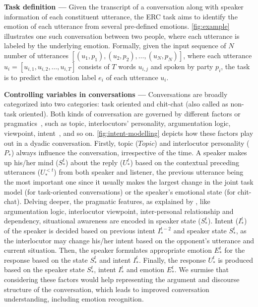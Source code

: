 \documentclass{IEEEtran}\usepackage[pdftex]{graphicx}
\begin{document}
	\textbf{Task definition --- }Given the transcript of a conversation along with speaker information
	of each constituent utterance, the ERC task aims to identify the emotion of each utterance from 
	several pre-defined emotions. \cref{fig:example} illustrates one such
	conversation between two people, where each utterance is labeled by the
	underlying emotion. Formally, given the input sequence of $N$ number of
	utterances $[(u_1, p_1), (u_2,p_2),\dots, (u_N,p_N)]$, where each utterance $u_i=[u_{i,1},u_{i,2},\dots,u_{i,T}]$ consists of $T$ words $u_{i,j}$ and spoken by
	party $p_i$, the task is to predict the emotion label $e_i$ of
	each utterance $u_i$.
	
	\textbf{Controlling variables in conversations ---} Conversations are broadly categorized into two categories: task oriented and chit-chat (also called as non-task oriented). Both kinds of conversation are governed by different factors or pragmatics~\cite{hovy1987generating}, such as topic, interlocutors' personality, argumentation logic, viewpoint, intent~\citep{schloder2015clarifying}, and so on. \cref{fig:intent-modelling} depicts how these factors play out in a dyadic conversation. Firstly, topic ($Topic$) and interlocutor personality ($P_*$) always influence the conversation, irrespective of the time. A speaker makes up his/her mind ($S^t_*$) about the reply ($U^t_*$) based on the contextual preceding utterances ($U^{<t}_*$) from both speaker and listener, the previous utterance being the most important one since it usually makes the largest change in the joint task model (for task-oriented conversations) or the speaker's emotional state (for chit-chat). Delving deeper, the pragmatic features, as explained by \citet{hovy1987generating}, like argumentation logic, interlocutor viewpoint, inter-personal relationship and dependency, situational awareness are encoded in speaker state ($S^t_*$). Intent ($I^t_*$) of the speaker is decided based on previous intent $I_*^{t-2}$ and speaker state $S_*^t$, as the interlocutor may change his/her intent based on the opponent's utterance and current situation. Then, the speaker formulates appropriate emotion $E_*^t$ for the response based on the state $S^t_*$ and intent $I^t_*$. Finally, the response $U^t_*$ is produced based on the speaker state $S^t_*$, intent $I^t_*$ and emotion $E^t_*$. We surmise that considering these factors would help representing the argument and discourse structure of the conversation, which leads to improved conversation understanding, including emotion recognition. 
	
\end{document}
